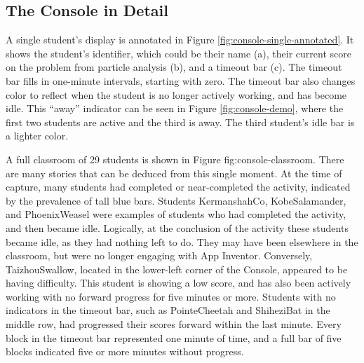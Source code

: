 \subsection{The Console in Detail}
A single student's display is annotated in Figure \ref{fig:console-single-annotated}. It shows the student's identifier, which could be their name (a), their current score on the problem from particle analysis (b), and a timeout bar (c). The timeout bar fills in one-minute intervals, starting with zero. The timeout bar also changes color to reflect when the student is no longer actively working, and has become idle. This ``away'' indicator can be seen in Figure \ref{fig:console-demo}, where the first two students are active and the third is away. The third student's idle bar is a lighter color.

A full classroom of 29 students is shown in Figure {fig:console-classroom}. There are many stories that can be deduced from this single moment. At the time of capture, many students had completed or near-completed the activity, indicated by the prevalence of tall blue bars. Students KermanshahCo, KobeSalamander, and PhoenixWeasel were examples of students who had completed the activity, and then became idle. Logically, at the conclusion of the activity these students became idle, as they had nothing left to do. They may have been elsewhere in the classroom, but were no longer engaging with App Inventor. Conversely, TaizhouSwallow, located in the lower-left corner of the Console, appeared to be having difficulty. This student is showing a low score, and has also been actively working with no forward progress for five minutes or more. Students with no indicators in the timeout bar, such as PointeCheetah and ShiheziBat in the middle row, had progressed their scores forward within the last minute. Every block in the timeout bar represented one minute of time, and a full bar of five blocks indicated five or more minutes without progress. 

